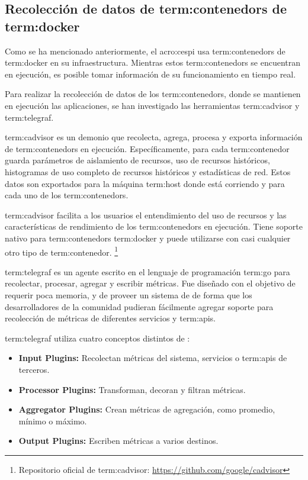 \subsection{Recolección de datos de \glspl{term:contenedor} de \gls{term:docker}}
\label{contenedores}

Como se ha mencionado anteriormente, el \gls{acro:cespi} usa
\glspl{term:contenedor} de \gls{term:docker} en su infraestructura. Mientras
estos \glspl{term:contenedor} se encuentran en ejecución, es posible tomar
información de su funcionamiento en tiempo real.

Para realizar la recolección de datos de los \glspl{term:contenedor}, donde se
mantienen en ejecución las aplicaciones, se han investigado las herramientas
\gls{term:cadvisor} y \gls{term:telegraf}.

\gls{term:cadvisor} es un demonio que recolecta, agrega, procesa y exporta
información de \glspl{term:contenedor} en ejecución.
Específicamente, para cada \gls{term:contenedor} guarda parámetros de
aislamiento de recursos, uso de recursos históricos, histogramas de uso
completo de recursos históricos y estadísticas de red. Estos datos son
exportados para la máquina \gls{term:host} donde está corriendo y para cada uno
de los \glspl{term:contenedor}.

\gls{term:cadvisor} facilita a los usuarios el entendimiento del uso de
recursos y las características de rendimiento de los \glspl{term:contenedor} en
ejecución.  Tiene soporte nativo para \glspl{term:contenedor} \gls{term:docker}
y puede utilizarse con casi cualquier otro tipo de \gls{term:contenedor}.
\footnote{Repositorio oficial de \gls{term:cadvisor}: \url{https://github.com/google/cadvisor}}

\gls{term:telegraf} es un agente escrito en el lenguaje de programación \gls{term:go} para
recolectar, procesar, agregar y escribir métricas. Fue diseñado con el objetivo
de requerir poca memoria, y de proveer un sistema de  de forma que
los desarrolladores de la comunidad pudieran fácilmente agregar soporte para
recolección de métricas de diferentes servicios y \glspl{term:api}.

\gls{term:telegraf} utiliza cuatro conceptos distintos de :

\begin{itemize}

  \item \textbf{Input Plugins:}
  Recolectan métricas del sistema, servicios o \glspl{term:api} de terceros.

  \item \textbf{Processor Plugins:}
  Transforman, decoran y filtran métricas.

  \item \textbf{Aggregator Plugins:}
  Crean métricas de agregación, como promedio, mínimo o máximo.

  \item \textbf{Output Plugins:}
  Escriben métricas a varios destinos.

\end{itemize}

